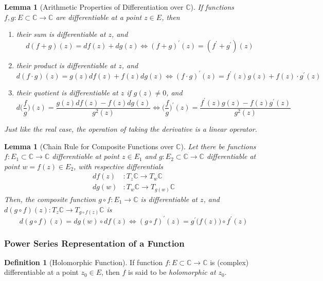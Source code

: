 \documentclass{article}
\newtheorem{lemma}[theorem]{Lemma}
\theoremstyle{remark}
\theoremstyle{definition}
\newtheorem{definition}{Definition}[section]
\begin{document}
\begin{lemma}[Arithmetic Properties of Differentiation over $\mathbb{C}$]
If functions $f, g: E \subset \mathbb{C} \longrightarrow \mathbb{C}$ are differentiable at a point $z \in E$, then 
\begin{enumerate}
    \item their sum is differentiable at $z$, and 
    \[d(f + g)(z) = df(z) + dg(z) \iff (f + g)^\prime (z) = (f^\prime + g^\prime)(z)\]
    \item their product is differentiable at $z$, and 
    \[d(f \cdot g) (z) = g(z) df(z) + f(z) dg(z) \iff (f \cdot g)^\prime (z) = f^\prime (z) g(z) + f(z) \cdot g^\prime (z)\]
    \item their quotient is differentiable at $z$ if $g(z) \neq 0$, and 
    \[d \bigg( \frac{f}{g}\bigg) (z) = \frac{g(z) df(z) - f(z) dg(z)}{g^2 (z)} \iff \bigg(\frac{f}{g}\bigg)^\prime (z) = \frac{f^\prime (z) g(z) - f(z) g^\prime (z)}{g^2 (z)}\]
\end{enumerate}
Just like the real case, the operation of taking the derivative is a linear operator. 
\end{lemma}

\begin{lemma}[Chain Rule for Composite Functions over $\mathbb{C}$]
Let there be functions $f: E_1 \subset \mathbb{C} \longrightarrow \mathbb{C}$ differentiable at point $z \in E_1$ and $g: E_2 \subset \mathbb{C} \longrightarrow \mathbb{C}$ differentiable at point $w = f(z) \in E_2$, with respective differentials 
\begin{align*}
    df(z) & : T_z \mathbb{C} \longrightarrow T_w \mathbb{C} \\
    dg(w) & : T_w \mathbb{C} \longrightarrow T_{g(w)} \mathbb{C}
\end{align*}
Then, the composite function $g \circ f: E_1 \longrightarrow \mathbb{C}$ is differentiable at $z$, and $d(g \circ f)(z): T_z \mathbb{C} \longrightarrow T_{g \circ f(z)} \mathbb{C}$ is
\[d(g \circ f) (z) = dg(w) \circ df(z) \iff (g \circ f)^\prime (z) = g^\prime \big(f(z)\big) \circ f^\prime (z)\]
\end{lemma}

\subsubsection{Power Series Representation of a Function}
\begin{definition}[Holomorphic Function]
If function $f: E \subset \mathbb{C} \longrightarrow \mathbb{C}$ is (complex) differentiable at a point $z_0 \in E$, then $f$ is said to be \textit{holomorphic at $z_0$}. 
\end{definition}
\end{document}
